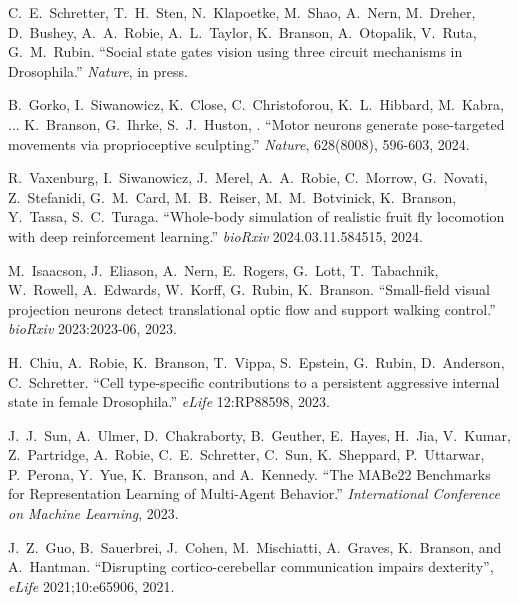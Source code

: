\begin{cvenum}

\item C.~E.~Schretter, T.~H.~Sten, N.~Klapoetke, M.~Shao, A.~Nern, M.~Dreher, D.~Bushey, A.~A.~Robie, A.~L.~Taylor, K.~Branson, A.~Otopalik, V.~Ruta, G.~M.~Rubin. ``Social state gates vision using three circuit mechanisms in Drosophila.'' {\em Nature}, in press.

\item B.~Gorko, I.~Siwanowicz, K.~Close, C.~Christoforou, K.~L.~Hibbard, M.~Kabra, ... K.~Branson, G.~Ihrke, S.~J.~Huston, . ``Motor neurons generate pose-targeted movements via proprioceptive sculpting.'' {\em Nature}, 628(8008), 596-603, 2024.

\item R.~Vaxenburg, I.~Siwanowicz, J.~Merel, A.~A.~Robie, C.~Morrow, G.~Novati, Z.~Stefanidi, G.~M.~Card, M.~B.~Reiser, M.~M.~Botvinick, K.~Branson, Y.~Tassa, S.~C.~Turaga. ``Whole-body simulation of realistic fruit fly locomotion with deep reinforcement learning.'' {\em bioRxiv} 2024.03.11.584515, 2024.

\item M.~Isaacson, J.~Eliason, A.~Nern, E.~Rogers, G.~Lott, T.~Tabachnik, W.~Rowell, A.~Edwards, W.~Korff, G.~Rubin, K.~Branson. ``Small-field visual projection neurons detect translational optic flow and support walking control.'' {\em bioRxiv} 2023:2023-06, 2023.

\item H.~Chiu, A.~Robie, K.~Branson, T.~Vippa, S.~Epstein, G.~Rubin, D.~Anderson, C.~Schretter. ``Cell type-specific contributions to a persistent aggressive internal state in female Drosophila.'' {\em eLife} 12:RP88598, 2023. 

\item J.~J.~Sun, A.~Ulmer, D.~Chakraborty, B.~Geuther, E.~Hayes, H.~Jia, V.~Kumar, Z.~Partridge, A.~Robie, C.~E.~Schretter,  C.~Sun, K.~Sheppard, P.~Uttarwar, P.~Perona, Y.~Yue, K.~Branson, and A.~Kennedy. ``The MABe22 Benchmarks for Representation Learning of Multi-Agent Behavior.'' {\em International Conference on Machine Learning}, 2023.

\item J.~Z.~Guo, B.~Sauerbrei, J.~Cohen, M.~Mischiatti, A.~Graves, K.~Branson, and A.~Hantman. ``Disrupting cortico-cerebellar communication impairs dexterity'', {\em eLife} 2021;10:e65906, 2021.
  

\end{cvenum}
